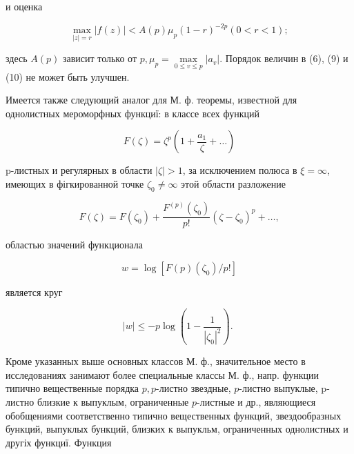 \documentclass[10pt]{article}
\begin{document}
и оценка



\[

\max _{|z|=r}|f(z)|<A(p) \mu_{p}(1-r)^{-2 p}(0<r<1) ;

\]



здесь $A(p)$ зависит только от $p, \mu_{p}=\underset{0 \leqslant v \leqslant p}{\max }\left|a_{v}\right|$. Порядок величин в (6), (9) и (10) не может быть улучшен.



Имеется также следующий аналог для М. ф. теоремы, известной для однолистных мероморфных функциї: в классе всех функций



\[

F(\zeta)=\zeta^{p}\left(1+\frac{a_{1}}{\zeta}+\ldots\right)

\]



p-листных и регулярных в области $|\zeta|>1$, за исключением полюса в $\xi=\infty$, имеющих в фігкированной точке $\zeta_{0} \neq \infty$ этой области разложение



\[

F(\zeta)=F\left(\zeta_{0}\right)+\frac{F^{(p)}\left(\zeta_{0}\right)}{p !}\left(\zeta-\zeta_{0}\right)^{p}+\ldots,

\]



областью значений функционала



\[

w=\log \left[F(p)\left(\zeta_{0}\right) / p !\right]

\]



является круг



\[

|w| \leqslant-p \log \left(1-\frac{1}{\left|\zeta_{0}\right|^{2}}\right) \text {. }

\]



Кроме указанных выше основных классов М. ф., значительное место в исследованиях занимают более специальные классы М. ф., напр. функции типично вещественные порядка $p, p$-листно звездные, $p$-листно выпуклые, p-листно близкие к выпуклым, ограниченные $p$-листные и др., являющиеся обобщениями соответственно типично вещественных функций, звездообразных бункций, выпуклых бункций, близких к выпукльм, ограниченных однолистных и другіх функциї. Функция
\end{document}
